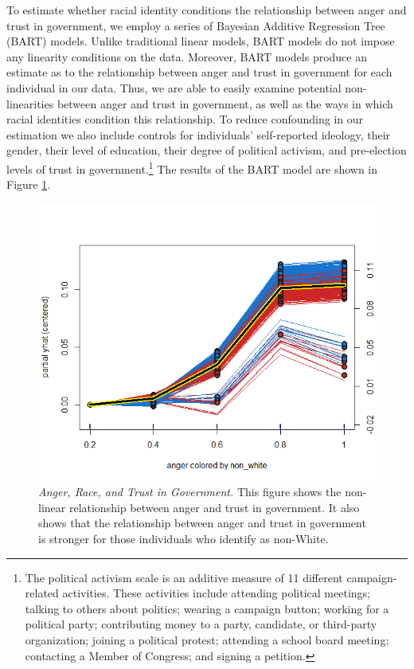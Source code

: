 \documentclass[12t, letterpaper]{article}
\begin{document}
To estimate whether racial identity conditions the relationship between anger and trust in government, we employ a series of Bayesian Additive Regression Tree (BART) models. Unlike traditional linear models, BART models do not impose any linearity conditions on the data. Moreover, BART models produce an estimate as to the relationship between anger and trust in government for each individual in our data. Thus, we are able to easily examine potential non-linearities between anger and trust in government, as well as the ways in which racial identities condition this relationship. To reduce confounding in our estimation we also include controls for individuals' self-reported ideology, their gender, their level of education, their degree of political activism, and pre-election levels of trust in government.\footnote{The political activism scale is an additive measure of 11 different campaign-related activities. These activities include attending political meetings; talking to others about politics; wearing a campaign button; working for a political party; contributing money to a party, candidate, or third-party organization; joining a political protest; attending a school board meeting; contacting a Member of Congress; and signing a petition.} The results of the BART model are shown in Figure \ref{fig:bart-results}.

\begin{center}
\begin{figure}
\begin{center}
\includegraphics[width=\textwidth]{bart_model}
\caption{\footnotesize\textit{Anger, Race, and Trust in Government.} This figure shows the non-linear relationship between anger and trust in government. It also shows that the relationship between anger and trust in government is stronger for those individuals who identify as non-White.}
\label{fig:bart-results}
\end{center}
\end{figure}
\end{center}
\end{document}
